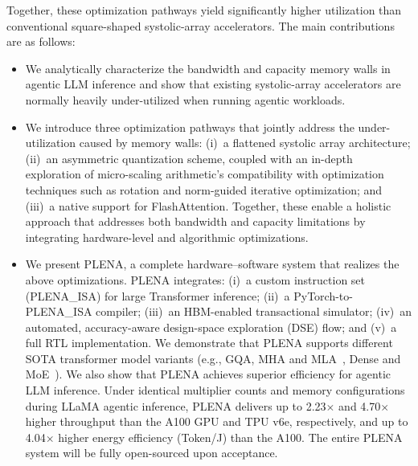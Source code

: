 Together, these optimization pathways yield significantly higher utilization than conventional square-shaped systolic-array accelerators. The main contributions are as follows:

\begin{itemize}[leftmargin=1em]
    \item We analytically characterize the bandwidth and capacity memory walls in agentic LLM inference and show that existing systolic-array accelerators are normally heavily under-utilized when running agentic workloads.

    \item We introduce three optimization pathways that jointly address the under-utilization caused by memory walls: (i)~a flattened systolic array architecture; (ii)~an asymmetric quantization scheme, coupled with an in-depth exploration of micro-scaling arithmetic's compatibility with optimization techniques such as rotation and norm-guided iterative optimization; and (iii)~a native support for FlashAttention. Together, these enable a holistic approach that addresses both bandwidth and capacity limitations by integrating hardware-level and algorithmic optimizations. 
    
    \item We present PLENA, a complete hardware–software system that realizes the above optimizations. PLENA integrates: (i)~a custom instruction set (PLENA\_ISA) for large Transformer inference; (ii)~a PyTorch-to-PLENA\_ISA compiler; (iii)~an HBM-enabled transactional simulator; (iv)~an automated, accuracy-aware design-space exploration (DSE) flow; and (v)~a full RTL implementation. We demonstrate that PLENA supports different SOTA transformer model variants (e.g., GQA, MHA and MLA~\cite{MLA}, Dense and MoE~\cite{MoE}). We also show that PLENA achieves superior efficiency for agentic LLM inference. Under identical multiplier counts and memory configurations during LLaMA agentic inference, PLENA delivers up to 2.23$\times$ and 4.70$\times$ higher throughput than the A100 GPU and TPU v6e, respectively, and up to 4.04$\times$ higher energy efficiency (Token/J) than the A100. The entire PLENA system will be fully open-sourced upon acceptance.
\end{itemize}

